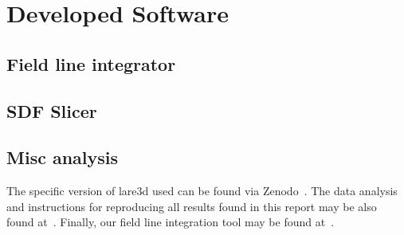 \chapter{Developed Software}

\section{Field line integrator}

\section{SDF Slicer}

\section{Misc analysis}

The specific version of lare3d used can be found via Zenodo~\cite{tonyarber_2019_3560251}. The data analysis and instructions for reproducing all results found in this report may be also found at~\cite{jamie_j_quinn_2019_3560245}. Finally, our field line integration tool may be found at~\cite{jamie_j_quinn_2019_3560249}.
